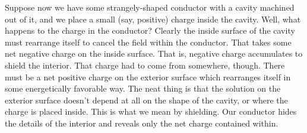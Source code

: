 Suppose now we have some strangely-shaped conductor with a cavity machined out of it, and we place a small (say, positive) charge inside the cavity. Well, what happens to the charge in the conductor? Clearly the inside surface of the cavity must rearrange itself to cancel the field within the conductor. That takes some net negative charge on the inside surface. That is, negative charge accumulates to shield the interior. That charge had to come from somewhere, though. There must be a net positive charge on the exterior surface which rearranges itself in some energetically favorable way. The neat thing is that the solution on the exterior surface doesn't depend at all on the shape of the cavity, or where the charge is placed inside. This is what we mean by shielding. Our conductor hides the details of the interior and reveals only the net charge contained within.